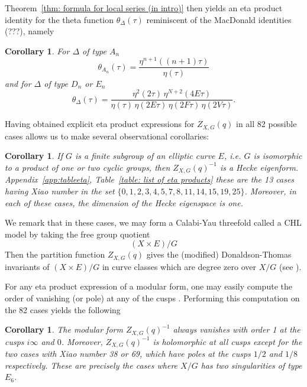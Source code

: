 \documentclass{article}
\newtheorem{corollary}[theorem]{Corollary}
\theoremstyle{definition}
\begin{document}
Theorem~\ref{thm: formula for local series (in intro)} then yields an
eta product identity for the theta function $\theta_{\Delta}(\tau )$
reminiscent of the MacDonald identities (???), namely
\begin{corollary}\label{cor: eta product for theta function}
For $\Delta$ of type $A_{n}$
\[
\theta_{A_{n}} (\tau ) = \frac{\eta^{n+1} ((n+1)\tau )}{\eta (\tau )}
\]
and for $\Delta$ of type $D_{n}$ or $E_{n}$ 
\[
\theta_{\Delta}(\tau ) = \frac{\eta^{2}(2\tau )\,\eta ^{N+2}(4E\tau
)}{\eta (\tau )\, \eta (2E\tau )\,\eta (2F\tau )\,\eta (2V\tau )}.
\]
\end{corollary}


Having obtained explicit eta product expressions for $Z_{X,G}(q)$ in all 82 possible
cases allows us to make several observational corollaries:

\begin{corollary}\label{cor: if G is a subgp of E then Zinv is a Hecke
eigenform} If $G$ is a finite subgroup of an elliptic curve $E$,
i.e. $G$ is isomorphic to a product of one or two cyclic groups, then
$Z_{X,G}(q)^{-1}$ is a Hecke eigenform. Appendix~\ref{app:tableeta},
Table~\ref{table: list of eta products} these are the 13 cases having
Xiao number in the set $\{0,1,2,3,4,5,7,8,11,14,15,19,25
\}$. Moreover, in each of these cases, the dimension of the Hecke
eigenspace is one.
\end{corollary}

We remark that in these cases, we may form a Calabi-Yau threefold
called a CHL model by taking the free group quotient
\[
(X\times E)/G
\]
Then the partition function $Z_{X,G}(q)$ gives the (modified)
Donaldson-Thomas invariants of $(X\times E)/G$ in curve classes which
are degree zero over $X/G$ (see \cite{bryan2018chl}).


For any eta product expression of a modular form, one may easily
compute the order of vanishing (or pole) at any of the cusps
\cite[Cor~2.2]{kohler2011eta}. Performing this computation on the 82
cases yields the following

\begin{corollary}\label{cor: vanishing at cusps}
The modular form $Z_{X,G}(q)^{-1}$ always vanishes with order 1 at the cusps
$i\infty$ and $0$. Moreover,
$Z_{X,G}(q)^{-1}$ is holomorphic at all cusps except for the two cases with
Xiao number 38 or 69, which have poles at the cusps $1/2$ and $1/8$
respectively. These are precisely the cases where $X/G$ has two
singularities of type $E_{6}$.
\end{corollary}
\end{document}
